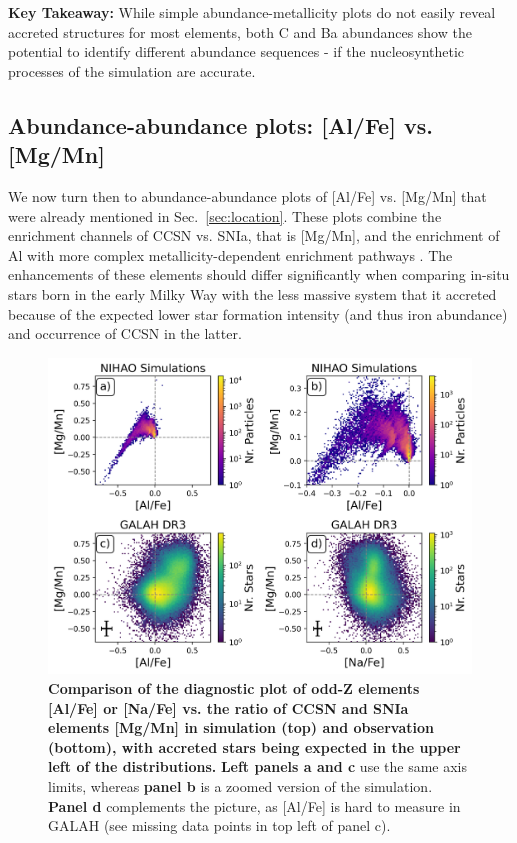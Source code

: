 \documentclass[fleqn,usenatbib]{mnras}
\begin{document}
\textbf{Key Takeaway:} While simple abundance-metallicity plots do not easily reveal accreted structures for most elements, both C and Ba abundances show the potential to identify different abundance sequences - if the nucleosynthetic processes of the simulation are accurate.

\subsection{Abundance-abundance plots: [Al/Fe] vs. [Mg/Mn]} \label{sec:alfe_mgmn}

We now turn then to abundance-abundance plots of [Al/Fe] vs. [Mg/Mn] that were already mentioned in Sec.~\ref{sec:location}. These plots combine the enrichment channels of CCSN vs. SNIa, that is [Mg/Mn], and the enrichment of Al with more complex metallicity-dependent enrichment pathways \citep{Hawkins2015, Das2020, Kobayashi2020}. The enhancements of these elements should differ significantly when comparing in-situ stars born in the early Milky Way with the less massive system that it accreted because of the expected lower star formation intensity (and thus iron abundance) and occurrence of CCSN in the latter. 

\begin{figure}
	\includegraphics[width=\columnwidth]{figures/mgmn_alfe.png}
    \caption{
    \textbf{Comparison of the diagnostic plot of odd-Z elements [Al/Fe] or [Na/Fe] vs. the ratio of CCSN and SNIa elements [Mg/Mn] in simulation (top) and observation (bottom), with accreted stars being expected in the upper left of the distributions.}
    \textbf{Left panels a and c} use the same axis limits, whereas \textbf{panel b} is a zoomed version of the simulation. \textbf{Panel d} complements the picture, as [Al/Fe] is hard to measure in GALAH (see missing data points in top left of panel c).
    }
    \label{fig:NaFe_MgMn_selection_Age_FeH_dissection}
\end{figure}
\end{document}
